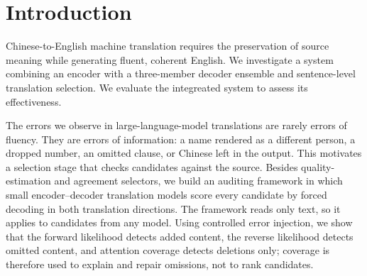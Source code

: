 \documentclass[11pt]{article}
\begin{document}
\maketitle

\begin{abstract}
We study sentence-level selection among Chinese-to-English translations produced by several large language models. Six pretrained models are adapted with QLoRA on the supplied corpus, and 120 ensemble configurations, each pairing three models with one of three selectors (COMETKiwi, chrF++ agreement and BERTScore agreement), are compared on development data. We also build a model-independent auditing framework in which small encoder--decoder models score every candidate by forced decoding in both translation directions, combined with a rule guard and consensus. Controlled error injection shows that forward likelihood detects added content, reverse likelihood detects omitted content, and attention coverage detects deletions only. In pools sampled from a single model, the framework improves COMET-22 over consensus selection by 0.3 to 0.5. On the final ensemble of fine-tuned Hunyuan-MT-7B, Qwen2.5-7B-Instruct and TowerInstruct-Mistral-7B, COMETKiwi selection is the best selector on the internal test subset (85.44 COMET-22) and on the WMT22 test set (83.01, 0.37 above the best single model), whereas selection weights learned on in-domain development data do not transfer to the WMT22 domains.
\end{abstract}
\section{Introduction}
\label{sec:introduction}
Chinese-to-English machine translation requires the preservation of source meaning while generating fluent, coherent English. We investigate a system combining an encoder with a three-member decoder ensemble and sentence-level translation selection. We evaluate the integreated system to assess its effectiveness.

The errors we observe in large-language-model translations are rarely errors of fluency. They are errors of information: a name rendered as a different person, a dropped number, an omitted clause, or Chinese left in the output. This motivates a selection stage that checks candidates against the source. Besides quality-estimation and agreement selectors, we build an auditing framework in which small encoder--decoder translation models score every candidate by forced decoding in both translation directions. The framework reads only text, so it applies to candidates from any model. Using controlled error injection, we show that the forward likelihood detects added content, the reverse likelihood detects omitted content, and attention coverage detects deletions only; coverage is therefore used to explain and repair omissions, not to rank candidates.
\end{document}

